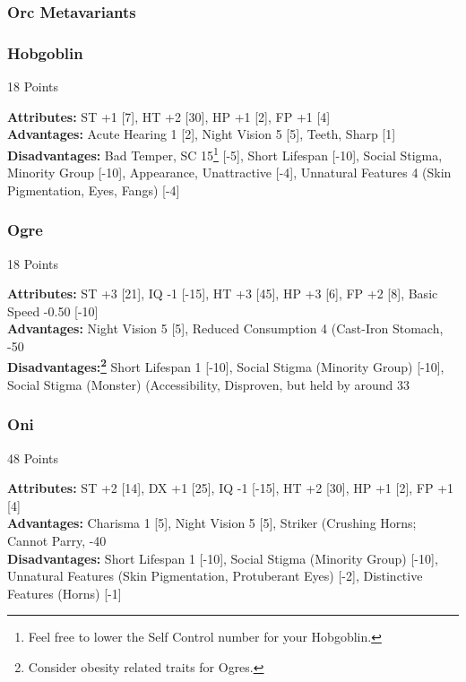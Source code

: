 \begin{multicols*}{3}
	\subsubsection{Orc Metavariants}
	
	\subsubsection*{Hobgoblin}
	\begin{flushright}
		18 Points
	\end{flushright}
	\textbf{Attributes:} 
	ST +1 [7], HT +2 [30], HP +1 [2], FP +1 [4]
	\\\textbf{Advantages:} 
	Acute Hearing 1 [2], Night Vision 5 [5], Teeth, Sharp [1]
	\\\textbf{Disadvantages:} 
	Bad Temper, SC 15\footnote{Feel free to lower the Self Control number for your Hobgoblin.} [-5], Short Lifespan [-10], Social Stigma, Minority Group [-10], Appearance, Unattractive [-4], Unnatural Features 4 (Skin Pigmentation, Eyes, Fangs) [-4]
	
	\subsubsection*{Ogre}
	\begin{flushright}
		18 Points
	\end{flushright}
	\textbf{Attributes:} 
	ST +3 [21], IQ -1 [-15], HT +3 [45], HP +3 [6], FP +2 [8], Basic Speed -0.50 [-10]
	\\\textbf{Advantages:} 
	Night Vision 5 [5], Reduced Consumption 4 (Cast-Iron Stomach, -50%
	\\\textbf{Disadvantages:\footnote{Consider obesity related traits for Ogres.}} 
	Short Lifespan 1 [-10], Social Stigma (Minority Group) [-10], Social Stigma (Monster) (Accessibility, Disproven, but held by around 33%
	
	\subsubsection*{Oni}
	\begin{flushright}
		48 Points
	\end{flushright}
	\textbf{Attributes:} 
	ST +2 [14], DX +1 [25], IQ -1 [-15], HT +2 [30], HP +1 [2], FP +1 [4]
	\\\textbf{Advantages:} 
	Charisma 1 [5], Night Vision 5 [5], Striker (Crushing Horns; Cannot Parry, -40%
	\\\textbf{Disadvantages:} 
	Short Lifespan 1 [-10], Social Stigma (Minority Group) [-10], Unnatural Features (Skin Pigmentation, Protuberant Eyes) [-2], Distinctive Features (Horns) [-1]
	

\end{multicols*}
